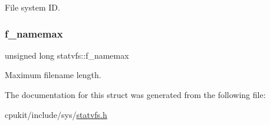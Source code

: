 File system ID. \mbox{\label{structstatvfs_a138cd6cae031d89d7ae90649fb667696}} 
\subsubsection{\texorpdfstring{f\_namemax}{f\_namemax}}
{\footnotesize\ttfamily unsigned long statvfs\+::f\+\_\+namemax}

Maximum filename length. 

The documentation for this struct was generated from the following file\+:\begin{DoxyCompactItemize}
\item 
cpukit/include/sys/\mbox{\hyperlink{statvfs_8h}{statvfs.\+h}}\end{DoxyCompactItemize}
